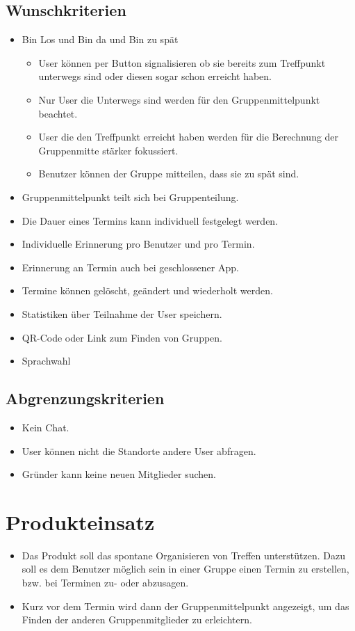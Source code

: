 \documentclass{scrartcl}
\begin{document}
	\subsection{Wunschkriterien}
	\begin{itemize}
		\item \grqq{}Bin Los\grqq{} und \grqq{}Bin da\grqq{} und \grqq{}Bin zu spät\grqq{}
		\begin{itemize}
			\item User können per Button signalisieren ob sie bereits zum Treffpunkt unterwegs sind oder diesen sogar schon erreicht haben.
			\item Nur User die Unterwegs sind werden für den Gruppenmittelpunkt beachtet.
			\item User die den Treffpunkt erreicht haben werden für die Berechnung der Gruppenmitte stärker fokussiert.
			\item Benutzer können der Gruppe mitteilen, dass sie zu spät sind.
		\end{itemize}
		\item Gruppenmittelpunkt teilt sich bei Gruppenteilung.
		\item Die Dauer eines Termins kann individuell festgelegt werden.
		\item Individuelle Erinnerung pro Benutzer und pro Termin.
		\item Erinnerung an Termin auch bei geschlossener App.
		\item Termine können gelöscht, geändert und wiederholt werden.
		\item Statistiken über Teilnahme der User speichern.
		\item QR-Code oder Link zum Finden von Gruppen.
		\item Sprachwahl
	\end{itemize}
	\subsection{Abgrenzungskriterien}
	\begin{itemize}
		\item Kein Chat.
		\item User können nicht die Standorte andere User abfragen.
		\item Gründer kann keine neuen Mitglieder suchen.
	\end{itemize}
	
	\newpage
	
	
	
	\section{Produkteinsatz}
	\begin{itemize}	        
		\item Das Produkt soll das spontane Organisieren von Treffen unterstützen. Dazu soll es dem Benutzer möglich sein in einer Gruppe einen Termin zu erstellen, bzw. bei Terminen zu- oder abzusagen.
		\item Kurz vor dem Termin wird dann der Gruppenmittelpunkt angezeigt, um das Finden der anderen Gruppenmitglieder zu erleichtern.
	\end{itemize}
\end{document}

